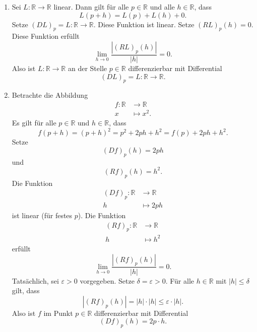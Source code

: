 \documentclass[../main.tex]{subfiles}
\begin{document}
\begin{examples}
  \leavevmode
  \begin{enumerate}[(1)]
    \item Sei $L \colon \mathbb{R} \to \mathbb{R}$ 
      linear.
      Dann gilt für alle $p \in \mathbb{R}$ und alle
      $h \in \mathbb{R}$, dass
      \[
        L(p + h) = L(p) + L(h) + 0.
      \]
      Setze ${(DL)}_p = L \colon \mathbb{R} \to \mathbb{R}$.
      Diese Funktion ist linear. Setze
      ${(RL)}_p(h) = 0$. Diese Funktion erfüllt
      \[
        \lim_{h \to 0} \frac{|{(RL)}_p(h)|}{|h|} = 0.
      \]
      Also ist $L \colon \mathbb{R} \to \mathbb{R}$
      an der Stelle $p \in \mathbb{R}$ 
      differenzierbar mit Differential
      \[
      {(DL)}_p = L \colon \mathbb{R} \to \mathbb{R}.
      \]
    \item Betrachte die Abbildung
      \begin{align*}
        f \colon \mathbb{R} & \to \mathbb{R} \\
        x & \mapsto x^2.
      \end{align*}
      Es gilt für alle $p \in \mathbb{R}$ und
      $h \in \mathbb{R}$, dass
      \[
        f( p + h ) = {(p + h)}^2
        = p^2 + 2ph + h^2
        = f(p) + 2ph + h^2.
      \]
      Setze
      \[
        {(Df)}_p(h) = 2ph
      \]
      und
      \[
        {(Rf)}_p(h) = h^2.
      \]
      Die Funktion
      \begin{align*}
        {(Df)}_p \colon \mathbb{R} & \to \mathbb{R} \\
        h & \mapsto 2ph
      \end{align*}
      ist linear (für festes $p$).
      Die Funktion
      \begin{align*}
        {(Rf)}_p \colon \mathbb{R} & \to \mathbb{R} \\
        h & \mapsto h^2
      \end{align*}
      erfüllt
      \[
        \lim_{h \to 0} \frac{|{(Rf)}_p(h)|}{|h|} = 0.
      \]
      Tatsächlich, sei $\varepsilon > 0$ vorgegeben.
      Setze $\delta = \varepsilon > 0$.
      Für alle $h \in \mathbb{R}$ mit $|h| \leq \delta$ gilt,
      dass
      \[
        |{(Rf)}_p(h)| = |h| \cdot |h| \leq \varepsilon \cdot |h|.
      \]
      Also ist $f$ im Punkt $p \in \mathbb{R}$ differenzierbar
      mit Differential
      \[
        {(Df)}_p(h) = 2p \cdot h.
      \]
  \end{enumerate}
  
\end{examples}
\end{document}

